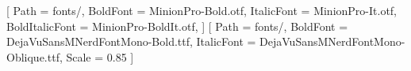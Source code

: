 \setlength{\parindent}{0pt}
  


\setmainfont{MinionPro-Regular.otf}[
  Path = fonts/,
  BoldFont = MinionPro-Bold.otf,
  ItalicFont = MinionPro-It.otf,
  BoldItalicFont = MinionPro-BoldIt.otf,
]
\setmonofont{DejaVuSansMNerdFontMono-Regular.ttf}[
  Path = fonts/,
  BoldFont = DejaVuSansMNerdFontMono-Bold.ttf,
  ItalicFont = DejaVuSansMNerdFontMono-Oblique.ttf,
  Scale = 0.85
]


\fancyhead[LO]{\leftmark}
\fancyhead[RO]{\thepage}
\fancyhead[RE]{\rightmark}
\fancyhead[LE]{\thepage}
\fancyfoot{}
